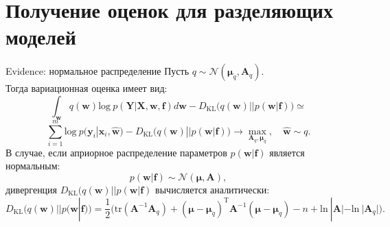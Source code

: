 \documentclass[10pt,pdf,utf8,russian,aspectratio=169]{beamer}
\begin{document}
\section{Получение оценок для разделяющих моделей}
\begin{frame}{Evidence: нормальное распределение}
Пусть $q \sim \mathcal{N}(\boldsymbol{\mu}_q, \mathbf{A}_q).$\\
Тогда вариационная оценка имеет вид:
$$
\int_{\mathbf{w}} q(\mathbf{w})\text{log}~{p(\mathbf{Y}|\mathbf{X},\mathbf{w},\mathbf{f})} d \mathbf{w} - D_\text{KL}\bigl(q (\mathbf{w} )|| p (\mathbf{w}|\mathbf{f})\bigr) \simeq
$$
$$
\sum_{i=1}^m \text{log}~p(\mathbf{y}_i|\mathbf{x}_i, \hat{\mathbf{w}}) - D_\text{KL}\bigl(q (\mathbf{w} )|| p (\mathbf{w}|\mathbf{f})\bigr) \to \max_{\mathbf{A}_q, \boldsymbol{\mu}_q}, \quad \hat{\mathbf{w}} \sim q.
$$
В случае, если априорное распределение параметров $p(\mathbf{w}|\mathbf{f})$ является нормальным: 
$$
p(\mathbf{w}|\mathbf{f}) \sim \mathcal{N}(\boldsymbol{\mu}, \mathbf{A}),
$$
дивергенция $D_\text{KL}\bigl(q (\mathbf{w} )|| p (\mathbf{w}|\mathbf{f})$ вычисляется аналитически:
$$
D_\text{KL}\bigl(q (\mathbf{w}) || p (\mathbf{w}|\mathbf{f})\bigr) = \frac{1}{2} \bigl( \text{tr} (\mathbf{A}^{-1}\mathbf{A}_q) + (\boldsymbol{\mu} - \boldsymbol{\mu}_q)^\text{T}\mathbf{A}^{-1}(\boldsymbol{\mu} - \boldsymbol{\mu}_q) - n +\text{ln}~|\mathbf{A}| - \text{ln}~|\mathbf{A}_q| \bigr).
$$
\end{frame}
\end{document}
